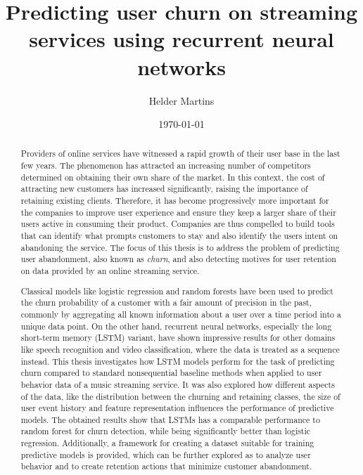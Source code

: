 \documentclass{kththesis}
\title{Predicting user churn on streaming services using recurrent neural networks}
\author{Helder Martins}
\date{\today}
\begin{document}
\flyleaf

\begin{abstract}
Providers of online services have witnessed a rapid growth of their user base in the last few years. The phenomenon has attracted an increasing number of competitors determined on obtaining their own share of the market. In this context, the cost of attracting new customers has increased significantly, raising the importance of retaining existing clients. Therefore, it has become progressively more important for the companies to improve user experience and ensure they keep a larger share of their users active in consuming their product. Companies are thus compelled to build tools that can identify what prompts customers to stay and also identify the users intent on abandoning the service. The focus of this thesis is to address the problem of predicting user abandonment, also known as \emph{churn}, and also detecting motives for user retention on data provided by an online streaming service. 

Classical models like logistic regression and random forests have been used to predict the churn probability of a customer with a fair amount of precision in the past, commonly by aggregating all known information about a user over a time period into a unique data point. On the other hand, recurrent neural networks, especially the long short-term memory (LSTM) variant, have shown impressive results for other domains like speech recognition and video classification, where the data is treated as a sequence instead. This thesis investigates how LSTM models perform for the task of predicting churn compared to standard nonsequential baseline methods when applied to user behavior data of a music streaming service. It was also explored how different aspects of the data, like the distribution between the churning and retaining classes, the size of user event history and feature representation influences the performance of predictive models. The obtained results show that LSTMs has a comparable performance to random forest for churn detection, while being significantly better than logistic regression.  Additionally, a framework for creating a dataset suitable for training predictive models is provided, which can be further explored as to analyze user behavior and to create retention actions that minimize customer abandonment.
\end{abstract}

\clearpage
\end{document}
